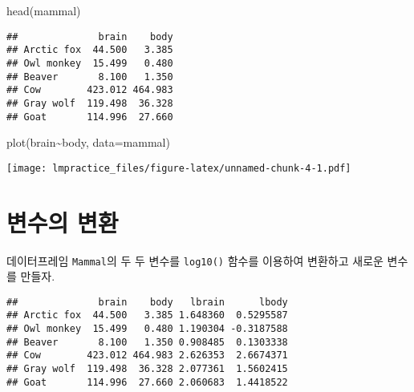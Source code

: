 \documentclass[
]{book}
\newenvironment{Shaded}{\begin{snugshade}}{\end{snugshade}}
\newcommand{\AttributeTok}[1]{\textcolor[rgb]{0.77,0.63,0.00}{#1}}
\newcommand{\FunctionTok}[1]{\textcolor[rgb]{0.00,0.00,0.00}{#1}}
\newcommand{\NormalTok}[1]{#1}
\newcommand{\OtherTok}[1]{\textcolor[rgb]{0.56,0.35,0.01}{#1}}
\newcommand{\SpecialCharTok}[1]{\textcolor[rgb]{0.00,0.00,0.00}{#1}}
\begin{document}
\begin{Shaded}
\begin{Highlighting}[]
\FunctionTok{head}\NormalTok{(mammal)}
\end{Highlighting}
\end{Shaded}

\begin{verbatim}
##              brain    body
## Arctic fox  44.500   3.385
## Owl monkey  15.499   0.480
## Beaver       8.100   1.350
## Cow        423.012 464.983
## Gray wolf  119.498  36.328
## Goat       114.996  27.660
\end{verbatim}

\begin{Shaded}
\begin{Highlighting}[]
\FunctionTok{plot}\NormalTok{(brain}\SpecialCharTok{\textasciitilde{}}\NormalTok{body, }\AttributeTok{data=}\NormalTok{mammal) }
\end{Highlighting}
\end{Shaded}

\texttt{[image: lmpractice\_files/figure-latex/unnamed-chunk-4-1.pdf]}

\hypertarget{uxbcc0uxc218uxc758-uxbcc0uxd658}{%
\section{변수의 변환}\label{uxbcc0uxc218uxc758-uxbcc0uxd658}}

데이터프레임 \texttt{Mammal}의 두 두 변수를 \texttt{log10()} 함수를 이용하여 변환하고 새로운 변수를 만들자.

\begin{Shaded}
\end{Shaded}

\begin{verbatim}
##              brain    body   lbrain      lbody
## Arctic fox  44.500   3.385 1.648360  0.5295587
## Owl monkey  15.499   0.480 1.190304 -0.3187588
## Beaver       8.100   1.350 0.908485  0.1303338
## Cow        423.012 464.983 2.626353  2.6674371
## Gray wolf  119.498  36.328 2.077361  1.5602415
## Goat       114.996  27.660 2.060683  1.4418522
\end{verbatim}
\end{document}

